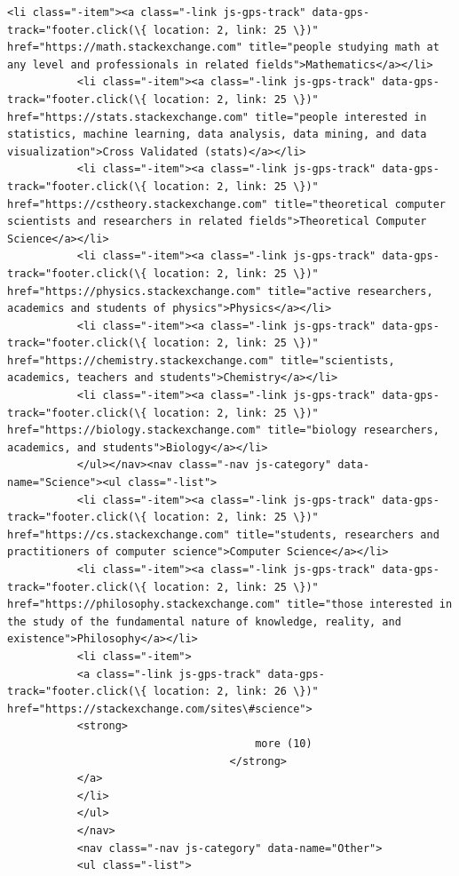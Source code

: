 \documentclass[11pt]{article}
\begin{document}
\begin{Verbatim}[commandchars=\\\{\}]
           <li class="-item"><a class="-link js-gps-track" data-gps-track="footer.click(\{ location: 2, link: 25 \})" href="https://math.stackexchange.com" title="people studying math at any level and professionals in related fields">Mathematics</a></li>
           <li class="-item"><a class="-link js-gps-track" data-gps-track="footer.click(\{ location: 2, link: 25 \})" href="https://stats.stackexchange.com" title="people interested in statistics, machine learning, data analysis, data mining, and data visualization">Cross Validated (stats)</a></li>
           <li class="-item"><a class="-link js-gps-track" data-gps-track="footer.click(\{ location: 2, link: 25 \})" href="https://cstheory.stackexchange.com" title="theoretical computer scientists and researchers in related fields">Theoretical Computer Science</a></li>
           <li class="-item"><a class="-link js-gps-track" data-gps-track="footer.click(\{ location: 2, link: 25 \})" href="https://physics.stackexchange.com" title="active researchers, academics and students of physics">Physics</a></li>
           <li class="-item"><a class="-link js-gps-track" data-gps-track="footer.click(\{ location: 2, link: 25 \})" href="https://chemistry.stackexchange.com" title="scientists, academics, teachers and students">Chemistry</a></li>
           <li class="-item"><a class="-link js-gps-track" data-gps-track="footer.click(\{ location: 2, link: 25 \})" href="https://biology.stackexchange.com" title="biology researchers, academics, and students">Biology</a></li>
           </ul></nav><nav class="-nav js-category" data-name="Science"><ul class="-list">
           <li class="-item"><a class="-link js-gps-track" data-gps-track="footer.click(\{ location: 2, link: 25 \})" href="https://cs.stackexchange.com" title="students, researchers and practitioners of computer science">Computer Science</a></li>
           <li class="-item"><a class="-link js-gps-track" data-gps-track="footer.click(\{ location: 2, link: 25 \})" href="https://philosophy.stackexchange.com" title="those interested in the study of the fundamental nature of knowledge, reality, and existence">Philosophy</a></li>
           <li class="-item">
           <a class="-link js-gps-track" data-gps-track="footer.click(\{ location: 2, link: 26 \})" href="https://stackexchange.com/sites\#science">
           <strong>
                                       more (10)
                                   </strong>
           </a>
           </li>
           </ul>
           </nav>
           <nav class="-nav js-category" data-name="Other">
           <ul class="-list">

\end{Verbatim}
\end{document}
